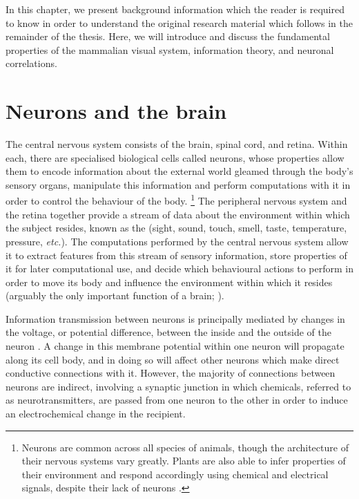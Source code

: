 

In this chapter, we present background information which the reader is required to know in order to understand the original research material which follows in the remainder of the thesis.
Here, we will introduce and discuss the fundamental properties of the mammalian visual system, information theory, and neuronal correlations.


\section{Neurons and the brain}

The central nervous system consists of the brain, spinal cord, and retina.
Within each, there are specialised biological cells called neurons, whose properties allow them to encode information about the external world gleamed through the body's sensory organs, manipulate this information and perform computations with it in order to control the behaviour of the body.%
\footnote{
Neurons are common across all species of animals, though the architecture of their nervous systems vary greatly.
Plants are also able to infer properties of their environment and respond accordingly using chemical and electrical signals, despite their lack of neurons \citep{Brenner2006,Barlow2008}.
}
The peripheral nervous system and the retina together provide a stream of data about the environment within which the subject resides, known as the  (sight, sound, touch, smell, taste, temperature, pressure, \textit{etc.}).
The computations performed by the central nervous system allow it to extract features from this stream of sensory information, store properties of it for later computational use, and decide which behavioural actions to perform in order to move its body and influence the environment within which it resides (arguably the only important function of a brain; \citealp{WolpertTED}).

Information transmission between neurons is principally mediated by changes in the voltage, or potential difference, between the inside and the outside of the neuron \citep[Chapter~2]{nsbook}.
A change in this membrane potential within one neuron will propagate along its cell body, and in doing so will affect other neurons which make direct conductive connections with it.
However, the majority of connections between neurons are indirect, involving a synaptic junction in which chemicals, referred to as neurotransmitters, are passed from one neuron to the other in order to induce an electrochemical change in the recipient.

